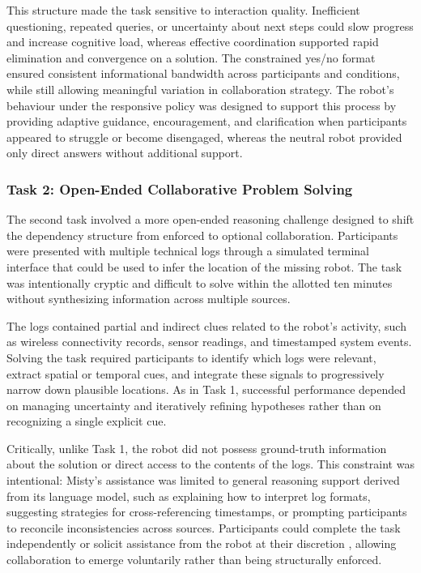\documentclass[
]{article}
\begin{document}
This structure made the task sensitive to interaction quality.
Inefficient questioning, repeated queries, or uncertainty about next
steps could slow progress and increase cognitive load, whereas effective
coordination supported rapid elimination and convergence on a solution.
The constrained yes/no format ensured consistent informational bandwidth
across participants and conditions, while still allowing meaningful
variation in collaboration strategy. The robot's behaviour under the
responsive policy was designed to support this process by providing
adaptive guidance, encouragement, and clarification when participants
appeared to struggle or become disengaged, whereas the neutral robot
provided only direct answers without additional support.

\subsubsection{Task 2: Open-Ended Collaborative Problem
Solving}\label{task-2-open-ended-collaborative-problem-solving}

The second task involved a more open-ended reasoning challenge designed
to shift the dependency structure from enforced to optional
collaboration. Participants were presented with multiple technical logs
through a simulated terminal interface that could be used to infer the
location of the missing robot. The task was intentionally cryptic and
difficult to solve within the allotted ten minutes without synthesizing
information across multiple sources.

The logs contained partial and indirect clues related to the robot's
activity, such as wireless connectivity records, sensor readings, and
timestamped system events. Solving the task required participants to
identify which logs were relevant, extract spatial or temporal cues, and
integrate these signals to progressively narrow down plausible
locations. As in Task 1, successful performance depended on managing
uncertainty and iteratively refining hypotheses rather than on
recognizing a single explicit cue.

Critically, unlike Task 1, the robot did not possess ground-truth
information about the solution or direct access to the contents of the
logs. This constraint was intentional: Misty's assistance was limited to
general reasoning support derived from its language model, such as
explaining how to interpret log formats, suggesting strategies for
cross-referencing timestamps, or prompting participants to reconcile
inconsistencies across sources. Participants could complete the task
independently or solicit assistance from the robot at their discretion
\autocite{lin2022}, allowing collaboration to emerge voluntarily rather
than being structurally enforced.
\end{document}
